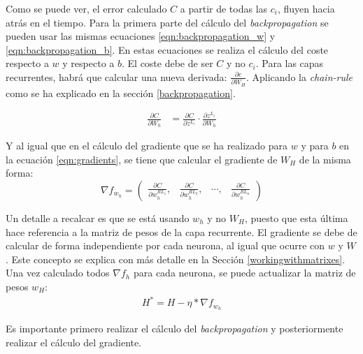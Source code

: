 Como se puede ver, el error calculado $C$ a partir de todas las $c_i$, fluyen hacia atrás en el tiempo.
Para la primera parte del cálculo del \textit{backpropagation} se pueden usar las mismas ecuaciones \ref{eqn:backpropagation_w} y \ref{eqn:backpropagation_b}. En estas ecuaciones se realiza el cálculo del coste respecto a $w$ y respecto a $b$. El coste debe de ser $C$ y no $c_i$. Para las capas recurrentes, habrá que calcular una nueva derivada: $\frac{\partial c}{\partial W_H}$. Aplicando la \textit{chain-rule} como se ha explicado en la sección \ref{backpropagation}.

\begin{equation}
\begin{split}
     \frac{\partial C}{\partial W_h} &= \frac{\partial C}{\partial z^{L_i}} \cdot \frac{\partial z^{L_i}}{\partial W_h}
\end{split}
\label{eqn:backpropagation_h}
\end{equation}

Y al igual que en el cálculo del gradiente que se ha realizado para $w$ y para $b$ en la ecuación \ref{eqn:gradients}, se tiene que calcular el gradiente de $W_H$ de la misma forma:
\begin{equation}
    \nabla f_{w_h} = \begin{pmatrix} \frac{\partial C}{\partial w_h^{RL_1}}, & \frac{\partial C}{\partial w_h^{RL_2}}, & \cdots , &  \frac{\partial C}{\partial w_h^{RL_n}} \end{pmatrix}
\end{equation}

Un detalle a recalcar es que se está usando $w_h$ y no $W_H$, puesto que esta última hace referencia a la matriz de pesos de la capa recurrente. El gradiente se debe de calcular de forma independiente por cada neurona, al igual que ocurre con $w$ y $W$. Este concepto se explica con más detalle en la Sección \ref{workingwithmatrixes}. Una vez calculado todos $\nabla f_h$ para cada neurona, se puede actualizar la matriz de pesos $w_{H}$:
\begin{equation}
    \begin{split}
    H^* = H - \eta * \nabla f_{w_h}
    \end{split}
\end{equation}

Es importante primero realizar el cálculo del \textit{backpropagation} y posteriormente realizar el cálculo del gradiente.
\newline
